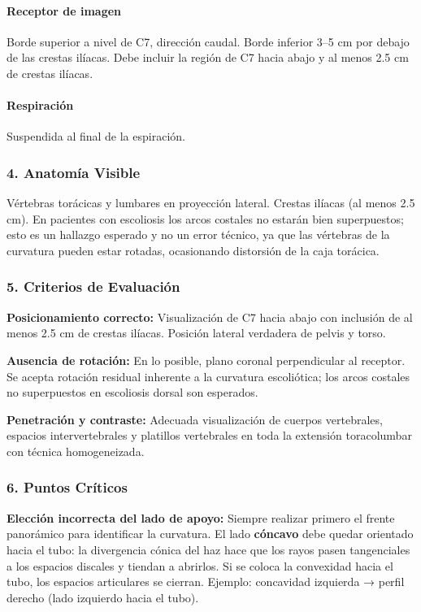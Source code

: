 	\paragraph{Receptor de imagen}
	Borde superior a nivel de C7, dirección caudal. Borde inferior 3--5 cm por debajo de las crestas ilíacas. Debe incluir la región de C7 hacia abajo y al menos 2.5 cm de crestas ilíacas.
	
	\paragraph{Respiración}
	Suspendida al final de la espiración.
	
	\subsubsection*{4. Anatomía Visible}
	
	Vértebras torácicas y lumbares en proyección lateral. Crestas ilíacas (al menos 2.5 cm). En pacientes con escoliosis los arcos costales no estarán bien superpuestos; esto es un hallazgo esperado y no un error técnico, ya que las vértebras de la curvatura pueden estar rotadas, ocasionando distorsión de la caja torácica.
	
	\subsubsection*{5. Criterios de Evaluación}
	
	\textbf{Posicionamiento correcto:} Visualización de C7 hacia abajo con inclusión de al menos 2.5 cm de crestas ilíacas. Posición lateral verdadera de pelvis y torso.
	
	\textbf{Ausencia de rotación:} En lo posible, plano coronal perpendicular al receptor. Se acepta rotación residual inherente a la curvatura escoliótica; los arcos costales no superpuestos en escoliosis dorsal son esperados.
	
	\textbf{Penetración y contraste:} Adecuada visualización de cuerpos vertebrales, espacios intervertebrales y platillos vertebrales en toda la extensión toracolumbar con técnica homogeneizada.
	
	\subsubsection*{6. Puntos Críticos}
	
	\textbf{Elección incorrecta del lado de apoyo:} Siempre realizar primero el frente panorámico para identificar la curvatura. El lado \textbf{cóncavo} debe quedar orientado hacia el tubo: la divergencia cónica del haz hace que los rayos pasen tangenciales a los espacios discales y tiendan a abrirlos. Si se coloca la convexidad hacia el tubo, los espacios articulares se cierran. Ejemplo: concavidad izquierda → perfil derecho (lado izquierdo hacia el tubo).
	
